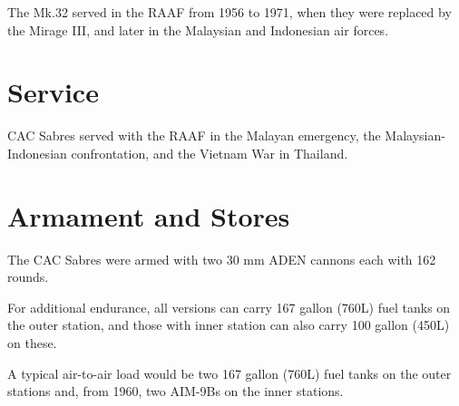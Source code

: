 The Mk.32 served in the RAAF from 1956 to 1971, when they were replaced by the Mirage III, and later in the Malaysian and Indonesian air forces.

\section{Service}

CAC Sabres served with the RAAF in the Malayan emergency, the Malaysian-Indonesian confrontation, and the Vietnam War in Thailand.

\section{Armament and Stores}

The CAC Sabres were armed with two 30 mm ADEN cannons each with 162 rounds.%

For additional endurance, all versions can carry 167 gallon (760L) fuel tanks on the outer station, and those with inner station can also carry 100 gallon (450L) on these.%

A typical air-to-air load would be two 167 gallon (760L) fuel tanks on the outer stations and, from 1960, two AIM-9Bs on the inner stations.

